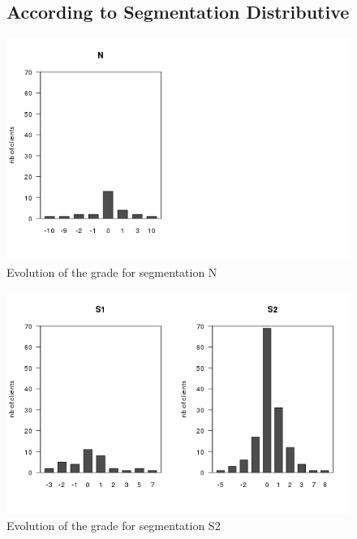 \documentclass[a4paper, 11pt]{article}
\begin{document}
        \begin{figure}[!ht]
				\subsection{According to Segmentation Distributive}
                \centering
                \includegraphics[height = 10 cm]{Remi/Evolution_of_the_grade_for_segmentation_N.png}
                \caption{Evolution of the grade for segmentation N}
                \label{fig:e_seg_N}
        \end{figure}

        \begin{figure}[!ht]
                \centering
                \includegraphics[height = 10 cm]{Remi/Evolution_of_the_grade_for_segmentation_S2.png}
                \caption{Evolution of the grade for segmentation S2}
                \label{fig:e_seg_S2}
        \end{figure}
\end{document}
